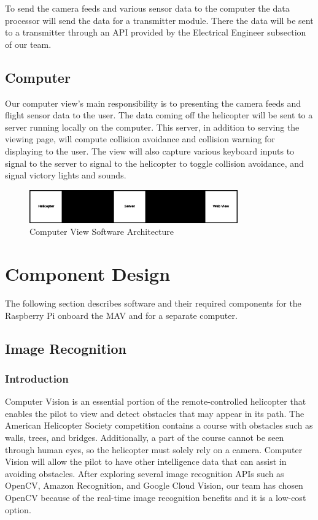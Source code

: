 \documentclass[onecolumn, oneside, letterpaper, draftclsnofoot, 10pt, compsoc]{IEEEtran}
\begin{document}
To send the camera feeds and various sensor data to the computer the data processor will send the data for a transmitter module. There the data will be sent to a transmitter through an API provided by the Electrical Engineer subsection of our team.

\subsection{Computer}
Our computer view's main responsibility is to presenting the camera feeds and flight sensor data to the user. The data coming off the helicopter will be sent to a server running locally on the computer. This server, in addition to serving the viewing page, will compute collision avoidance and collision warning for displaying to the user. The view will also capture various keyboard inputs to signal to the server to signal to the helicopter to toggle collision avoidance, and signal victory lights and sounds.

\begin{figure}[h]
    \centering
    \includegraphics[width=0.8\textwidth]{graphics/computer_diagram.eps}
    \caption{Computer View Software Architecture}
    \label{fig:ComputerViewSoftwareArchitecture}
\end{figure}

\section{Component Design}
The following section describes software and their required components for the Raspberry Pi onboard the MAV and for a separate computer.

\subsection{Image Recognition}
\subsubsection{Introduction}
Computer Vision is an essential portion of the remote-controlled helicopter that enables the pilot to view and detect obstacles that may appear in its path. The American Helicopter Society competition contains a course with obstacles such as walls, trees, and bridges. Additionally, a part of the course cannot be seen through human eyes, so the helicopter must solely rely on a camera. Computer Vision will allow the pilot to have other intelligence data that can assist in avoiding obstacles. After exploring several image recognition APIs such as OpenCV, Amazon Recognition, and Google Cloud Vision, our team has chosen OpenCV because of the real-time image recognition benefits and it is a low-cost option.
\end{document}
